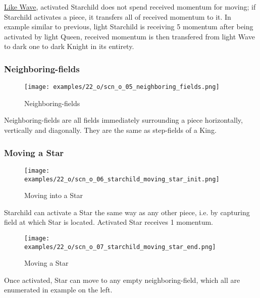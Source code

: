 \hyperref[fig:10_wave]{Like Wave}, activated Starchild does not spend received momentum for moving;
if Starchild activates a piece, it transfers all of received momentum to it. In example similar to
previous, light Starchild is receiving 5 momentum after being activated by light Queen, received
momentum is then transfered from light Wave to dark one to dark Knight in its entirety.

\clearpage %

\subsubsection*{Neighboring-fields}

\noindent
\begin{wrapfigure}[5]{l}{0.4\textwidth}
\centering
\texttt{[image: examples/22\_o/scn\_o\_05\_neighboring\_fields.png]}
\caption{Neighboring-fields}
\label{fig:scn_o_05_neighboring_fields}
\end{wrapfigure}
Neighboring-fields are all fields immediately surrounding a piece horizontally, vertically
and diagonally. They are the same as step-fields of a King.


\vspace*{2.1\baselineskip}
\subsubsection*{Moving a Star}

\noindent
\begin{wrapfigure}[5]{l}{0.4\textwidth}
\centering
\texttt{[image: examples/22\_o/scn\_o\_06\_starchild\_moving\_star\_init.png]}
\caption{Moving into a Star}
\label{fig:scn_o_06_starchild_moving_star_init}
\end{wrapfigure}
Starchild can activate a Star the same way as any other piece, i.e. by capturing field at
which Star is located. Activated Star receives 1 momentum.

\vspace*{2.1\baselineskip}
\noindent
\begin{wrapfigure}[7]{l}{0.4\textwidth}
\centering
\texttt{[image: examples/22\_o/scn\_o\_07\_starchild\_moving\_star\_end.png]}
\caption{Moving a Star}
\label{fig:scn_o_07_starchild_moving_star_end}
\end{wrapfigure}
Once activated, Star can move to any empty neighboring-field, which all are enumerated in
example on the left.

